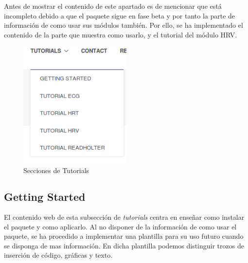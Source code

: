 Antes de mostrar el contenido de este apartado es de mencionar que está incompleto debido a que el paquete sigue en fase beta y por tanto la parte de información de como usar sus módulos también. Por ello, se ha implementado el contenido de la parte que muestra como usarlo, y el tutorial del módulo HRV. 

\begin{figure}[H]
    \centering
    \includegraphics[width=0.5\textwidth]{img/tutorials_panel.png}
    \caption{Secciones de Tutorials }
    \label{fig:tutoWebPanel}
\end{figure}





\subsection*{Getting Started}
El contenido web de esta subsección de \textit{tutorials} centra en enseñar como instalar el paquete y como aplicarlo. Al no disponer de la información de como usar el paquete, se ha procedido a implementar una plantilla para su uso futuro cuando se disponga de mas información. En dicha plantilla podemos distinguir trozos de inserción de código, gráficas y texto. 

